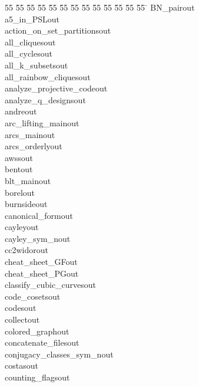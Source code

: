 %
%
\begin{tabbing}
55 \= 55 \= 55 \= 55 \= 55 \= 55 \= 55 \= 55 \= 55 \= 55 \= 55 \= 55 \= 55 \= \kill
BN\_pairout\\[0pt]
a5\_in\_PSLout\\[0pt]
action\_on\_set\_partitionsout\\[0pt]
all\_cliquesout\\[0pt]
all\_cyclesout\\[0pt]
all\_k\_subsetsout\\[0pt]
all\_rainbow\_cliquesout\\[0pt]
analyze\_projective\_codeout\\[0pt]
analyze\_q\_designsout\\[0pt]
andreout\\[0pt]
arc\_lifting\_mainout\\[0pt]
arcs\_mainout\\[0pt]
arcs\_orderlyout\\[0pt]
awssout\\[0pt]
bentout\\[0pt]
blt\_mainout\\[0pt]
borelout\\[0pt]
burnsideout\\[0pt]
canonical\_formout\\[0pt]
cayleyout\\[0pt]
cayley\_sym\_nout\\[0pt]
cc2widorout\\[0pt]
cheat\_sheet\_GFout\\[0pt]
cheat\_sheet\_PGout\\[0pt]
classify\_cubic\_curvesout\\[0pt]
code\_cosetsout\\[0pt]
codesout\\[0pt]
collectout\\[0pt]
colored\_graphout\\[0pt]
concatenate\_filesout\\[0pt]
conjugacy\_classes\_sym\_nout\\[0pt]
costasout\\[0pt]
counting\_flagsout\\[0pt]

\end{tabbing}
